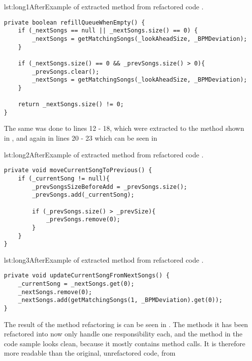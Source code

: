 
\begin{code}{lst:long1After}{Example of extracted method from refactored code .}
\begin{lstlisting}
private boolean refillQueueWhenEmpty() {
    if (_nextSongs == null || _nextSongs.size() == 0) {
        _nextSongs = getMatchingSongs(_lookAheadSize, _BPMDeviation);
    }
    
    if (_nextSongs.size() == 0 && _prevSongs.size() > 0){
        _prevSongs.clear();
        _nextSongs = getMatchingSongs(_lookAheadSize, _BPMDeviation);
    }
    
    return _nextSongs.size() != 0;
}
\end{lstlisting}
\end{code}


The same was done to lines 12 - 18, which were extracted to the method shown in , and again in lines 20 - 23 which can be seen in 


\begin{code}{lst:long2After}{Example of extracted method from refactored code .}
\begin{lstlisting}
private void moveCurrentSongToPrevious() {
    if (_currentSong != null){
        _prevSongsSizeBeforeAdd = _prevSongs.size();
        _prevSongs.add(_currentSong);

        if (_prevSongs.size() > _prevSize){
            _prevSongs.remove(0);
        }
    }
}
\end{lstlisting}
\end{code}


\begin{code}{lst:long3After}{Example of extracted method from refactored code .}
\begin{lstlisting}
private void updateCurrentSongFromNextSongs() {
    _currentSong = _nextSongs.get(0);
    _nextSongs.remove(0);
    _nextSongs.add(getMatchingSongs(1, _BPMDeviation).get(0));
}
\end{lstlisting}
\end{code}


The result of the method refactoring is can be seen in . The methods it has been refactored into now only handle one responsibility each, and the method in the code sample looks clean, because it mostly contains method calls. It is therefore more readable than the original, unrefactored code, from 

